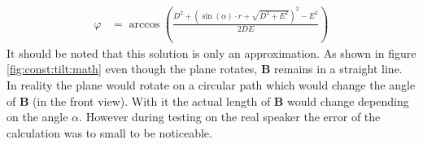%
\begin{align}
  \varphi &= \arccos \left( \frac{D^2 + (\sin (\alpha) \cdot r + \sqrt{D^2 + E^2})^2 - E^2}{2DE} \right)
\end{align}
%
It should be noted that this solution is only an approximation. As shown in figure \ref{fig:const:tilt:math} even though the plane rotates, \textbf{B} remains in a straight line. In reality the plane would rotate on a circular path which would change the angle of \textbf{B} (in the front view). With it the actual length of \textbf{B} would change depending on the angle $\alpha$. However during testing on the real speaker the error of the calculation was to small to be noticeable.